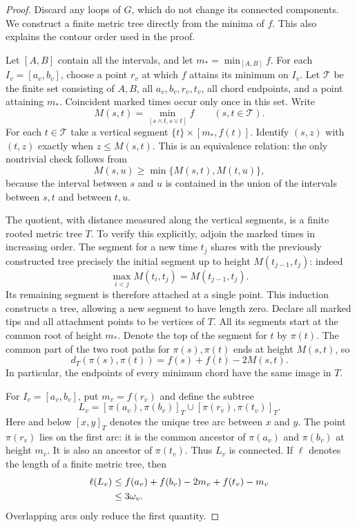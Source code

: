 \begin{proof}
Discard any loops of $G$, which do not change its connected components.
We construct a finite metric tree directly from the minima of $f$.  This
also explains the contour order used in the proof.

Let $[A,B]$ contain all the intervals, and let
$m_*=\min_{[A,B]}f$.  For each $I_v=[a_v,b_v]$, choose a point $r_v$ at
which $f$ attains its minimum on $I_v$.  Let $\mathcal T$ be the finite set
consisting of $A,B$, all $a_v,b_v,r_v,t_v$, all chord endpoints, and a
point attaining $m_*$.  Coincident marked times occur only once in this
set.  Write
\[
 M(s,t)=\min_{[s\wedge t,s\vee t]}f\qquad(s,t\in\mathcal T).
\]
For each $t\in\mathcal T$ take a vertical segment
$\{t\}\times[m_*,f(t)]$.  Identify $(s,z)$ with $(t,z)$ exactly when
$z\le M(s,t)$.  This is an equivalence relation: the only nontrivial
check follows from
\[
 M(s,u)\ge\min\{M(s,t),M(t,u)\},
\]
because the interval between $s$ and $u$ is contained in the union of the
intervals between $s,t$ and between $t,u$.

The quotient, with distance measured along the vertical segments, is a
finite rooted metric tree $T$.  To verify this explicitly, adjoin the
marked times in increasing order.  The segment for a new time $t_j$
shares with the previously constructed tree precisely the initial
segment up to height $M(t_{j-1},t_j)$: indeed
\[
 \max_{i<j}M(t_i,t_j)=M(t_{j-1},t_j).
\]
Its remaining segment is therefore attached at a single point.  This
induction constructs a tree, allowing a new segment to have length zero.
Declare all marked tips and all attachment points to be vertices of $T$.
All its segments start at the common root of height $m_*$.  Denote the
top of the segment for $t$ by $\pi(t)$.  The common part of the two root
paths for $\pi(s),\pi(t)$ ends at height $M(s,t)$, so
\begin{equation}\label{arm:finite-contour-tree-distance}
 d_T(\pi(s),\pi(t))=f(s)+f(t)-2M(s,t).
\end{equation}
In particular, the endpoints of every minimum chord have the same image
in $T$.

For $I_v=[a_v,b_v]$, put $m_v=f(r_v)$ and define the subtree
\[
 L_v=[\pi(a_v),\pi(b_v)]_T
       \mathbin{\cup}[\pi(r_v),\pi(t_v)]_T.
\]
Here and below $[x,y]_T$ denotes the unique tree arc between $x$ and $y$.
The point $\pi(r_v)$ lies on the first arc: it is the common ancestor of
$\pi(a_v)$ and $\pi(b_v)$ at height $m_v$.  It is also an ancestor of
$\pi(t_v)$.  Thus $L_v$ is connected.  If $\ell$ denotes the length of a
finite metric tree, then
\begin{align}\label{arm:box-skeleton-length}
 \ell(L_v)
 &\le f(a_v)+f(b_v)-2m_v+f(t_v)-m_v\\
 &\le 3\omega_v.\notag
\end{align}
Overlapping arcs only reduce the first quantity.


\end{proof}
